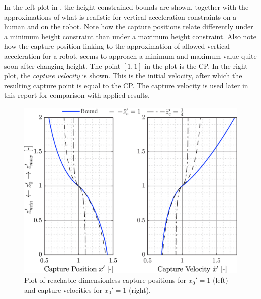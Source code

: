In the left plot in , the height constrained bounds are shown, together with the approximations of what is realistic for vertical acceleration constraints on a human and on the robot. Note how the capture positions relate differently under a minimum height constraint than under a maximum height constraint. Also note how the capture position linking to the approximation of allowed vertical acceleration for a robot, seems to approach a minimum and maximum value quite soon after changing height. The point $[1,1]$ in the plot is the \ac{CP}. In the right plot, the \textit{capture velocity} is shown. This is the initial velocity, after which the resulting capture point is equal to the \ac{CP}. The capture velocity is used later in this report for comparison with applied results.
\begin{figure}
      \centering
      \includegraphics[width=5.2in]{STYLESTUFF/caplimits1.png}
      \caption{Plot of reachable dimensionless capture positions for $\dot{x}_0'=1$ (left) and capture velocities for $x_0' = 1$ (right). }
      \label{fig:caplimits}
\end{figure}

